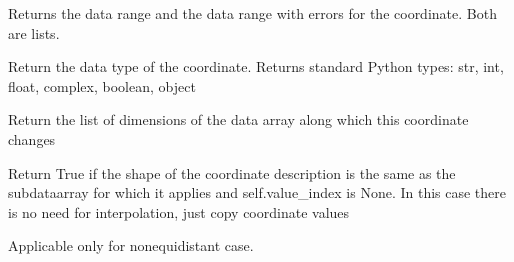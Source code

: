 \documentclass[letterpaper,10pt,english]{sphinxmanual}
\begin{document}
\begin{fulllineitems}
\begin{fulllineitems}
\begin{description}
\end{description}

\end{fulllineitems}


\begin{fulllineitems}
\label{\detokenize{coordinate:flap.coordinate.Coordinate.data_range}}
Returns the data range and the data range with errors for the coordinate. Both are lists.

\end{fulllineitems}


\begin{fulllineitems}
\label{\detokenize{coordinate:flap.coordinate.Coordinate.dtype}}
Return the data type of the coordinate.
Returns standard Python types: str, int, float, complex, boolean, object

\end{fulllineitems}


\begin{fulllineitems}
\label{\detokenize{coordinate:flap.coordinate.Coordinate.nochange_dimensions}}
Return the list of dimensions of the data array along which this coordinate
changes

\end{fulllineitems}


\begin{fulllineitems}
\label{\detokenize{coordinate:flap.coordinate.Coordinate.non_interpol}}
Return True if the shape of the coordinate description
is the same as the sub\sphinxhyphen{}data\sphinxhyphen{}array for which it applies and self.value\_index is None.
In this case there is no need for interpolation, just copy coordinate values

Applicable only for non\sphinxhyphen{}equidistant case.

\end{fulllineitems}


\end{fulllineitems}
\end{document}
